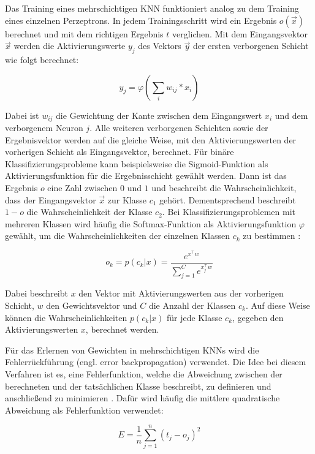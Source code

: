 Das Training eines mehrschichtigen \ac{KNN} funktioniert analog zu dem Training eines einzelnen Perzeptrons. In jedem Trainingsschritt wird ein Ergebnis $o(\vec{x})$ berechnet und mit dem richtigen Ergebnis $t$ verglichen. Mit dem Eingangsvektor $\vec{x}$ werden die Aktivierungswerte $y_j$ des Vektors  $\vec{y}$ der ersten verborgenen Schicht wie folgt berechnet:

\begin{equation}
y_j = \varphi(\sum_i{w_{ij}*x_i})
\end{equation}

Dabei ist $w_{ij}$ die Gewichtung der Kante zwischen dem Eingangswert $x_i$ und dem verborgenem Neuron $j$. Alle weiteren verborgenen Schichten sowie der Ergebnisvektor werden auf die gleiche Weise, mit den Aktivierungswerten der vorherigen Schicht als Eingangsvektor, berechnet. Für binäre Klassifizierungsprobleme kann beispielsweise die Sigmoid-Funktion als Aktivierungsfunktion für die Ergebnisschicht gewählt werden. Dann ist das Ergebnis $o$ eine Zahl zwischen $0$ und $1$ und beschreibt die Wahrscheinlichkeit, dass der Eingangsvektor $\vec{x}$ zur Klasse $c_1$ gehört. Dementsprechend beschreibt $1-o$ die Wahrscheinlichkeit der Klasse $c_2$. Bei Klassifizierungsproblemen mit mehreren Klassen wird häufig die Softmax-Funktion als Aktivierungsfunktion $\varphi$ gewählt, um die Wahrscheinlichkeiten der einzelnen Klassen $c_k$ zu bestimmen \cite{bridle1990probabilistic}:

\begin{equation}
o_k = p(c_k|x) = \frac{e^{x^\top w}}{\sum_{j=1}^Ce^{x_j^\top w}}
\end{equation}

Dabei beschreibt $x$ den Vektor mit Aktivierungswerten aus der vorherigen Schicht, $w$ den Gewichtsvektor und $C$ die Anzahl der Klassen $c_k$. Auf diese Weise können die Wahrscheinlichkeiten $p(c_k|x)$ für jede Klasse $c_k$, gegeben den Aktivierungswerten $x$, berechnet werden.

Für das Erlernen von Gewichten in mehrschichtigen \acp{KNN} wird die Fehlerrückführung (engl. error backpropagation) verwendet. Die Idee bei diesem Verfahren ist es, eine Fehlerfunktion, welche die Abweichung zwischen der berechneten und der tatsächlichen Klasse beschreibt, zu definieren und anschließend zu minimieren \cite{bishop2006pattern}. Dafür wird häufig die mittlere quadratische Abweichung als Fehlerfunktion verwendet:

\begin{equation}
E = \frac{1}{n}\sum_{j=1}^n(t_j-o_j)^2
\end{equation}

